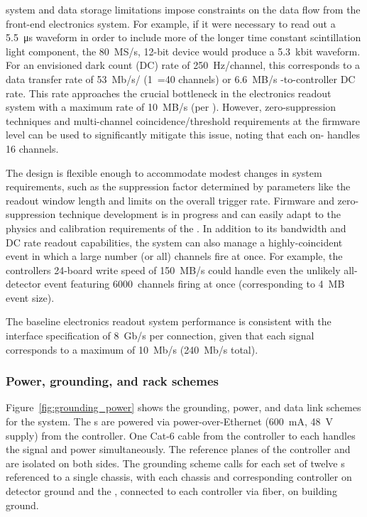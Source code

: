  system and data storage limitations impose constraints on the  data flow from the front-end electronics system. 
For example, if it were necessary to read out a \SI{5.5}{\micro\second} waveform in order to include more of the longer time constant scintillation light component, the \SI{80}{MS/s}, 12-bit  device would produce a 5.3~kbit waveform. For an envisioned dark count (DC) rate of 250~Hz/channel, this corresponds to a data transfer rate of \SI{53}{Mb/s}/ (1~=40 channels) or \SI{6.6}{MB/s} -to-controller DC rate. This rate approaches the crucial bottleneck in the electronics readout system with a maximum rate of \SI{10}{MB/s} (per ). However, zero-suppression techniques and multi-channel coincidence/threshold requirements at the  firmware level can be used to significantly mitigate this issue, noting that each on-  handles 16 channels. 

The design is flexible enough to accommodate modest changes in system requirements, such as the suppression factor determined by parameters like the readout window length and limits on the overall trigger rate. 
Firmware and zero-suppression technique development is in progress and can easily adapt to the physics and calibration requirements of the .
In addition to its bandwidth and DC rate readout capabilities, the system can also  manage a highly-coincident event in which a large number (or all) channels fire at once. 
For example, the controllers 24-board write speed of \SI{150}{MB/s} could handle even the unlikely all-detector event featuring 6000~channels firing at once (corresponding to \SI{4}{MB} event size). 

The baseline electronics readout system performance is consistent with the  interface specification of \SI{8}{Gb/s} per connection, given that
each  signal corresponds to a maximum of \SI{10}{Mb/s} (\SI{240}{Mb/s} total).  

\subsubsection{Power, grounding, and rack schemes} 

Figure~\ref{fig:grounding_power} shows the grounding, power, and data link schemes for the system. The s are powered via power-over-Ethernet (\SI{600}{mA}, \SI{48}{V} supply) from the controller. One Cat-6 cable from the controller to each  handles the signal and power simultaneously. The reference planes of the controller and  are isolated on both sides. The grounding scheme calls for each set of twelve s referenced to a single chassis, with each chassis and corresponding controller on detector ground and the , connected to each controller via fiber, on building ground. 
 
